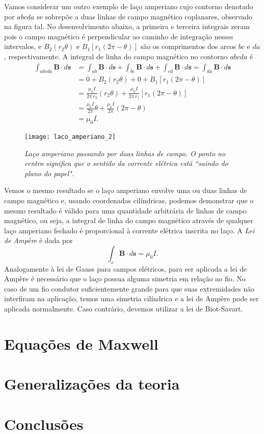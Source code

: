 Vamos considerar um outro exemplo de laço amperiano cujo contorno denotado por $abcda$ se sobrepõe a duas linhas de campo magnético coplanares, observado na figura tal. No desenvolvimento abaixo, a primeira e terceira integrais zeram pois o campo magnético é perpendicular ao caminho de integração nesses intervalos, e $B_2(r_2\theta)$ e $B_1[r_1(2\pi-\theta)]$ são os comprimentos dos arcos $bc$ e $da$, respectivamente. A integral de linha do campo magnético no contorno $abcda$ é
\begin{align*}
\int_{abcda}\textbf{B}\cdot d\textbf{s}&=\int_{ab}\textbf{B}\cdot d\textbf{s}+\int_{bc}\textbf{B}\cdot d\textbf{s}+\int_{cd}\textbf{B}\cdot d\textbf{s}=\int_{da}\textbf{B}\cdot d\textbf{s}\\
&=0+B_2(r_2\theta)+0+B_1[r_1(2\pi-\theta)]\\
&=\frac{\mu_0I}{2\pi\,r_2}(r_2\theta)+\frac{\mu_0I}{2\pi\,r_1}[r_1(2\pi-\theta)]\\
&=\frac{\mu_0I}{2\pi}\theta+\frac{\mu_0I}{2\pi}(2\pi-\theta)\\
&=\mu_0I.
\end{align*}
\begin{figure}
\centering
\texttt{[image: laco\_amperiano\_2]}
\caption{\textit{Laço amperiano passando por duas linhas de campo. O ponto no centro significa que o sentido da corrente elétrica está ``saindo do plano do papel".}}
\label{fig.laco_amper_2}
\end{figure}
Vemos o mesmo resultado se o laço amperiano envolve uma ou duas linhas de campo magnético e, usando coordenadas cilíndricas, podemos demonstrar que o mesmo resultado é válido para uma quantidade arbitrária de linhas de campo magnético, ou seja, a integral de linha do campo magnético através de qualquer laço amperiano fechado é proporcional à corrente elétrica inscrita no laço. A \textit{Lei de Ampère} é dada por
\begin{equation*}
\int_{s}\textbf{B}\cdot d\textbf{s}=\mu_0I.
\end{equation*}
Analogamente à lei de Gauss para campos elétricos, para ser aplicada a lei de Ampère é necessário que o laço possua alguma simetria em relação ao fio. No caso de um fio condutor suficientemente grande para que suas extremidades não interfiram na aplicação, temos uma simetria cilíndrica e a lei de Ampère pode ser aplicada normalmente. Caso contrário, devemos utilizar a lei de Biot-Savart. 


\section{Equações de Maxwell}

\section{Generalizações da teoria}

\section{Conclusões}